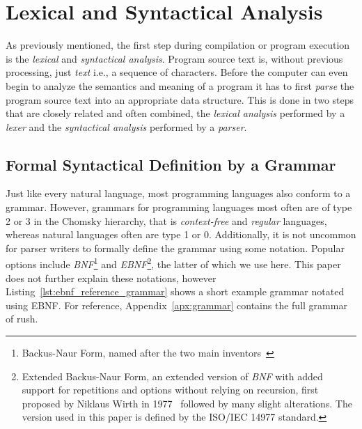 \section{Lexical and Syntactical Analysis}

As previously mentioned, the first step during compilation or program execution is the \emph{lexical} and \emph{syntactical analysis}.
Program source text is, without previous processing, just \emph{text} i.e., a sequence of characters.
Before the computer can even begin to analyze the semantics and meaning of a program it has to first \emph{parse} the program source text into an appropriate data structure.
This is done in two steps that are closely related and often combined, the \emph{lexical analysis} performed by a \emph{lexer} and the \emph{syntactical analysis} performed by a \emph{parser}.

\subsection{Formal Syntactical Definition by a Grammar}

Just like every natural language, most programming languages also conform to a grammar.
However, grammars for programming languages most often are of type 2 or 3 in the Chomsky hierarchy, that is \emph{context-free} and \emph{regular} languages, whereas natural languages often are type 1 or 0.
Additionally, it is not uncommon for parser writers to formally define the grammar using some notation.
Popular options include \emph{BNF}\footnote{Backus-Naur Form, named after the two main inventors~\cite{Backus1960}} and \emph{EBNF}\footnote{Extended Backus-Naur Form, an extended version of \emph{BNF} with added support for repetitions and options without relying on recursion, first proposed by Niklaus Wirth in 1977~\cite{Wirth1977} followed by many slight alterations. The version used in this paper is defined by the ISO/IEC 14977 standard.},  the latter of which we use here.
This paper does not further explain these notations, however Listing~\ref{lst:ebnf_reference_grammar} shows a short example grammar notated using EBNF.
For reference, Appendix~\ref{apx:grammar} contains the full grammar of rush.


